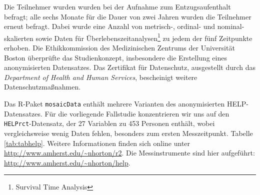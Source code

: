 \documentclass[
  ngerman,
]{scrbook}
\begin{document}
Die Teilnehmer wurden wurden bei der Aufnahme zum Entzugsaufenthalt befragt; alle sechs Monate für die Dauer von zwei Jahren wurden die Teilnehmer erneut befragt. Dabei wurde eine Anzahl von metrisch-, ordinal- und nominal-skalierten sowie Daten für Überlebenszeitanalysen\footnote{Survival Time Analysis} zu jedem der fünf Zeitpunkte erhoben. Die Ethikkommission des Medizinischen Zentrums der Universität Boston überprüfte das Studienkonzept, insbesondere die Erstellung eines anonymisierten Datensatzes. Das Zertifikat für Datenschutz, ausgestellt durch das \emph{Department of Health and Human Services}, bescheinigt weitere Datenschutzmaßnahmen.

Das \textsf{R}-Paket \texttt{mosaicData} enthält mehrere Varianten des anonymisierten \textsc{HELP}-Datensatzes. Für die vorliegende Fallstudie konzentrieren wir uns auf den \texttt{HELPrct}-Datensatz, der 27 Variablen zu 453 Personen enthält, wobei vergleichsweise wenig Daten fehlen, besonders zum ersten Messzeitpunkt. Tabelle \ref{tab:tabhelp}. Weitere Informationen finden sich online unter \url{http://www.amherst.edu/~nhorton/r2}. Die Messinstrumente sind hier aufgeführt: \url{http://www.amherst.edu/~nhorton/help}.

\newpage
\thispagestyle{empty}
\end{document}

